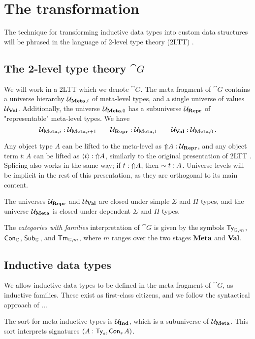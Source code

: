 \section{The transformation}\label{sec:prelim}

The technique for transforming inductive data types into custom data structures
will be phrased in the language of 2-level type theory (2LTT)
\cite{Kovacs2022-vb}.

\subsection{The 2-level type theory $\cat{G}$}

We will work in a 2LTT which we denote $\cat{G}$. The meta fragment of
$\cat{G}$ contains a universe hierarchy ${\mathcal{U}_{{\textbf{Meta},i}}}$ of meta-level
types, and a single universe of values ${{\mathcal{U}_{{\textbf{Val}}}}}$. Additionally, the universe
${\mathcal{U}_{{\textbf{Meta},0}}}$ has a subuniverse ${{\mathcal{U}_{{\textbf{Repr}}}}}$ of "representable" meta-level
types. We have
\[
  {\mathcal{U}_{{\textbf{Meta},i}}} : {\mathcal{U}_{{\textbf{Meta},i+1}}} \qquad {{\mathcal{U}_{{\textbf{Repr}}}}} : {\mathcal{U}_{{\textbf{Meta},1}}} \qquad {{\mathcal{U}_{{\textbf{Val}}}}} : {\mathcal{U}_{{\textbf{Meta},0}}} \,.
\]

Any object type $A$ can be lifted to the meta-level as $\text{$\Uparrow$}{A} : {{\mathcal{U}_{{\textbf{Repr}}}}}$, and any
object term $t : A$ can be lifted as $\langle{t}\rangle : \text{$\Uparrow$}{A}$, similarly to the
original presentation of 2LTT \cite{Kovacs2022-vb}. Splicing also works in the
same way; if $t : \text{$\Uparrow$}{A}$, then $\text{$\sim{t}$} : A$. Universe levels will be
implicit in the rest of this presentation, as they are orthogonal to its main
content.

The universes ${{\mathcal{U}_{{\textbf{Repr}}}}}$ and ${{\mathcal{U}_{{\textbf{Val}}}}}$ are closed under simple $\Sigma$ and $\Pi$ types,
and the universe ${{\mathcal{U}_{{\textbf{Meta}}}}}$ is closed under dependent $\Sigma$ and $\Pi$ types.

The \emph{categories with families} interpretation of $\cat{G}$ is given by the
symbols ${\textsf{Ty}}_{\mathbb{G},m}$, ${\textsf{Con}}_{\mathbb{G}}$, ${\textsf{Sub}}_{\mathbb{G}}$, and
${\textsf{Tm}}_{\mathbb{G},m}$, where $m$ ranges over the two stages $\textbf{Meta}$ and
$\textbf{Val}$.

\subsection{Inductive data types}

We allow inductive data types to be defined in the meta fragment of $\cat{G}$,
as inductive families. These exist as first-class citizens, and we follow the
syntactical approach of \cite{Dybjer1994-zx} ...

The sort for meta inductive types is ${{\mathcal{U}_{{\textbf{Ind}}}}}$, which is a subuniverse of ${{\mathcal{U}_{{\textbf{Meta}}}}}$.
This sort interprets signatures $(A : {\textsf{Ty}}_s, {\textsf{Con}}_s \, A)$.

